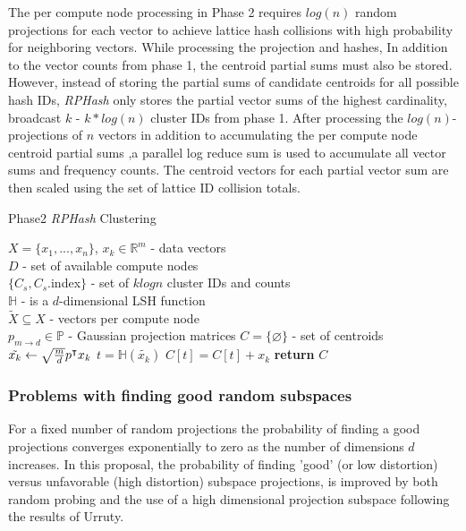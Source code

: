 \documentclass[a4paper,10pt]{article}
\begin{document}
The per compute node processing in Phase 2 requires $log(n)$ random
projections\cite{panigrahy} for each vector to achieve lattice hash collisions
with high probability for neighboring vectors.	While processing the projection
and hashes, In addition to the vector counts from phase 1, the centroid partial
sums must also be stored.  However, instead of storing the partial sums of
candidate centroids for all possible hash IDs, \emph{RPHash} only stores the
partial vector sums of the highest cardinality, broadcast $k$ - $k*log(n)$
cluster IDs from phase 1.  After processing the $log(n)$-projections of $n$
vectors in addition to accumulating the per compute node centroid partial
sums ,a parallel log reduce sum is used to accumulate all vector sums and
frequency counts.  The centroid vectors for each partial vector sum are then
scaled using the set of lattice ID collision totals.


%
\begin{algorithm}
\caption{Phase2 \emph{RPHash} Clustering}\label{Phase2}
\begin{algorithmic}[1]
\REQUIRE $X=\{x_1,...,x_n\}$, $x_k \in \mathbb{R}^m$ - data vectors\\
$D$ - set of available compute nodes\\
$\{C_s,C_s.$index$\}$ - set of $klogn$ cluster IDs and counts\\
$\mathbb{H}$ - is a $d$-dimensional LSH function\\
$\widetilde{X} \subseteq X$ - vectors per compute node\\
$p_{m\rightarrow d}\in \mathbb{P}$ - Gaussian projection matrices
\STATE $C=\{\varnothing\}$ - set of centroids
\STATE $\tilde{x_k}\leftarrow \sqrt{{m}\over{d}}p^{\intercal}x_k $
\STATE $t = \mathbb{H}(\tilde{x_k})$
\STATE $C[t]=C[t]+x_k$
\ENDIF
\ENDFOR
\ENDFOR
\State \textbf{return} ${C}$
\end{algorithmic}
\end{algorithm}
\subsubsection{Problems with finding good random subspaces} 
For a fixed number of random projections the
probability of finding a good projections converges exponentially to zero as
the number of dimensions $d$ increases\cite{florescu09}.  In this proposal,
the probability of finding 'good' (or low distortion) versus unfavorable
(high distortion) subspace projections, is improved by both random probing
and the use of a high dimensional projection subspace following the results
of Urruty\cite{Urruty2007}.
\end{document}
